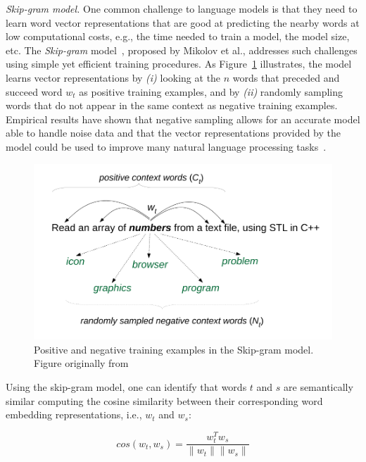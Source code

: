 \smallskip
\begin{hangparas}{.0in}{0}
     \textit{ Skip-gram model.} One common challenge to language models is that they need to learn word vector representations that are good at predicting the nearby words at low computational costs, e.g., the time needed to train a model, the model size, etc.
    The \textit{Skip-gram} model~\cite{Mikolov2013}, proposed by Mikolov et al., addresses such challenges using simple yet efficient training procedures. As Figure~\ref{fig:skip-gram-example} illustrates, the model learns vector representations by \textit{(i)} looking at the $n$ words that preceded and succeed word $w_t$
     as positive training examples, and by \textit{(ii)} randomly sampling words that do not appear in the same context as negative training examples. Empirical results have shown that negative sampling allows for an accurate model able to handle noise data and that 
     the vector representations provided by the model could be used to improve many natural language processing tasks~\cite{mikolov2013efficient}.
\end{hangparas}

\begin{figure}[H]
    \centering
    \includegraphics[width=.65\linewidth]{fig/cp5/ye-skip-gram-example}
    \caption{Positive and negative training examples in the Skip-gram model. Figure originally from~\cite{Ye2016}  }
    \label{fig:skip-gram-example}
\end{figure}


Using the skip-gram model, one can identify that words $t$ and $s$ are semantically similar 
computing the cosine similarity between their corresponding word embedding representations, i.e., $w_t$ and $w_s$:



\begin{equation}
    cos(w_t,w_s) = \frac{w_t^Tw_s}{\|w_t\| \|w_s\|}
    \label{eq:word-sim}
\end{equation}





